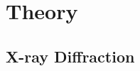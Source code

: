 \documentclass[12pt]{book}
\begin{document}
\chapter{Theory}
\section{X-ray Diffraction}
    

%     
%         
%         

%     

\newpage
\sloppy %
\printbibliography
\end{document}
